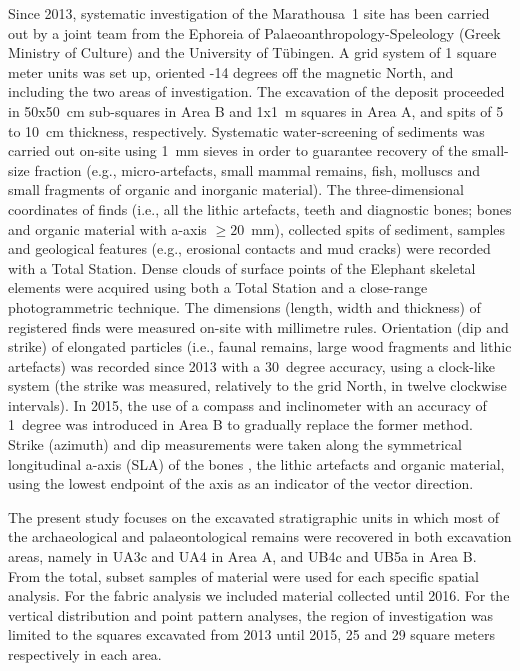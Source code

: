 \documentclass[review,authoryear,times]{elsarticle} %
\begin{document}
Since 2013, systematic investigation of the Marathousa~1 site has been carried out by a joint team from the Ephoreia of Palaeoanthropology-Speleology (Greek Ministry of Culture) and the University of Tübingen. A grid system of 1 square meter units was set up, oriented -14 degrees off the magnetic North, and including the two areas of investigation. The excavation of the deposit proceeded in 50x50~cm sub-squares in Area B and 1x1~m squares in Area A, and spits of 5 to 10~cm thickness, respectively. Systematic water-screening of sediments was carried out on-site using 1~mm sieves in order to guarantee recovery of the small-size fraction (e.g., micro-artefacts, small mammal remains, fish, molluscs and small fragments of organic and inorganic material). The three-dimensional coordinates of finds (i.e., all the lithic artefacts, teeth and diagnostic bones; bones and organic material with a-axis $\geq20$~mm), collected spits of sediment, samples and geological features (e.g., erosional contacts and mud cracks) were recorded with a Total Station. Dense clouds of surface points of the Elephant skeletal elements were acquired using both a Total Station and a close-range photogrammetric technique. 
The dimensions (length, width and thickness) of registered finds were measured on-site with millimetre rules. Orientation (dip and strike) of elongated particles (i.e., faunal remains, large wood fragments and lithic artefacts) was recorded since 2013 with a 30~degree accuracy, using a clock-like system (the strike was measured, relatively to the grid North, in twelve clockwise intervals). In 2015, the use of a compass and inclinometer with an accuracy of 1~degree was introduced in Area B to gradually replace the former method. Strike (azimuth) and dip measurements were taken along the symmetrical longitudinal a-axis (SLA) of the bones \citep{Dominguez-Rodrigo2013}, the lithic artefacts \citep{Bertran1995} and organic material, using the lowest endpoint of the axis as an indicator of the vector direction.


The present study focuses on the excavated stratigraphic units in which most of the archaeological and palaeontological remains were recovered in both excavation areas, namely in UA3c and UA4 in Area A, and UB4c and UB5a in Area B. From the total, subset samples of material were used for each specific spatial analysis. For the fabric analysis we included material collected until 2016. For the vertical distribution and point pattern analyses, the region of investigation was limited to the squares excavated from 2013 until 2015, 25 and 29 square meters respectively in each area.
\end{document}
